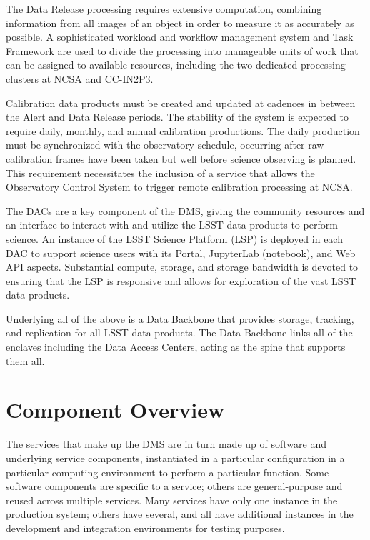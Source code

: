 \documentclass[DM,toc,lsstdraft]{lsstdoc}
\begin{document}
The Data Release processing requires extensive computation, combining
information from all images of an object in order to measure it as
accurately as possible.  A sophisticated workload and workflow management
system and Task Framework are used to divide the processing into
manageable units of work that can be assigned to available resources,
including the two dedicated processing clusters at NCSA and CC-IN2P3.

Calibration data products must be created and updated at cadences in between
the Alert and Data Release periods.  The stability of the system is expected to
require daily, monthly, and annual calibration productions.  The daily
production must be synchronized with the observatory schedule, occurring after
raw calibration frames have been taken but well before science observing is
planned.  This requirement necessitates the inclusion of a service that allows
the Observatory Control System to trigger remote calibration processing at
NCSA.

The DACs are a key component of the DMS, giving the community resources and an
interface to interact with and utilize the LSST data products to perform
science.  An instance of the LSST Science Platform (LSP) is deployed in each
DAC to support science users with its Portal, JupyterLab (notebook), and Web
API aspects.  Substantial compute, storage, and storage bandwidth is devoted to
ensuring that the LSP is responsive and allows for exploration of the vast
LSST data products.

Underlying all of the above is a Data Backbone that provides storage, tracking,
and replication for all LSST data products.  The Data Backbone links all of the
enclaves including the Data Access Centers, acting as the spine that
supports them all.



\section{Component Overview}\label{component-overview}

The services that make up the DMS are in turn made up of software and
underlying service components, instantiated in a particular
configuration in a particular computing environment to perform a
particular function. Some software components are specific to a service;
others are general-purpose and reused across multiple services. Many
services have only one instance in the production system; others have
several, and all have additional instances in the development and
integration environments for testing purposes.
\end{document}
